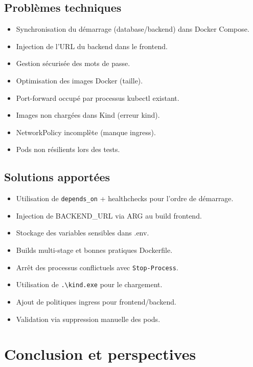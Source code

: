 \documentclass[11pt,a4paper,oneside]{report}
\begin{document}
\section{Problèmes techniques}
\begin{itemize}
\item Synchronisation du démarrage (database/backend) dans Docker Compose.
\item Injection de l'URL du backend dans le frontend.
\item Gestion sécurisée des mots de passe.
\item Optimisation des images Docker (taille).
\item Port-forward occupé par processus kubectl existant.
\item Images non chargées dans Kind (erreur kind).
\item NetworkPolicy incomplète (manque ingress).
\item Pods non résilients lors des tests.
\end{itemize}

\section{Solutions apportées}
\begin{itemize}
\item Utilisation de \texttt{depends\_on} + healthchecks pour l'ordre de démarrage.
\item Injection de BACKEND\_URL via ARG au build frontend.
\item Stockage des variables sensibles dans .env.
\item Builds multi-stage et bonnes pratiques Dockerfile.
\item Arrêt des processus conflictuels avec \texttt{Stop-Process}.
\item Utilisation de \texttt{.\textbackslash kind.exe} pour le chargement.
\item Ajout de politiques ingress pour frontend/backend.
\item Validation via suppression manuelle des pods.
\end{itemize}

\chapter{Conclusion et perspectives}
\end{document}
